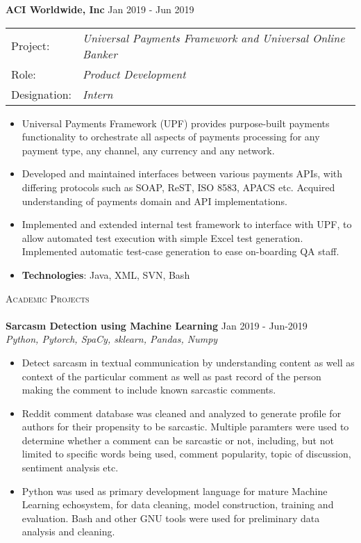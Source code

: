 \documentclass[a4paper]{article}
\newcommand{\lineunder} {
    \vspace*{-8pt} \\
    \hspace*{-18pt} \hrulefill \\
}
\newcommand{\header} [1] {
    {\hspace*{-18pt}\vspace*{6pt} \textsc{#1}}
    \vspace*{-6pt} \lineunder
}
\begin{document}
\textbf{ACI Worldwide, Inc}  \hfill Jan 2019 - Jun 2019\\
\begin{tabular}{ l l }
Project: & \textit{Universal Payments Framework and Universal Online Banker } \\
Role: & \textit{Product Development} \\
Designation: & \textit{Intern} \\
\end{tabular}
\vspace{-1mm}
\begin{itemize} \itemsep 1pt
	\item Universal Payments Framework (UPF) provides purpose-built payments functionality to orchestrate all aspects of payments processing for any payment type, any channel, any currency and any network.
	\item Developed and maintained interfaces between various payments APIs, with differing protocols such as SOAP, ReST, ISO 8583, APACS etc. Acquired understanding of payments domain and API implementations.
	\item Implemented and extended internal test framework to interface with UPF, to allow automated test execution with simple Excel test generation. Implemented automatic test-case generation to ease on-boarding QA staff.
	\item \textbf{Technologies}: Java, XML, SVN, Bash
\end{itemize}

\header{Academic Projects}
\vspace{1mm}
{\textbf{Sarcasm Detection using Machine Learning}} \hfill Jan 2019 - Jun-2019\\
\textit{Python, Pytorch, SpaCy, sklearn, Pandas, Numpy} \\
\begin{itemize}
   \item Detect sarcasm in textual communication by understanding content as well as context of the particular comment as well as past record of the person making the comment to include known sarcastic comments.\\
  \item Reddit comment database was cleaned and analyzed to generate profile for authors for their propensity to be sarcastic. Multiple paramters were used to determine whether a comment can be sarcastic or not, including, but not limited to specific words being used, comment popularity, topic of discussion, sentiment analysis etc.
  \item Python was used as primary development language for mature Machine Learning echosystem, for data cleaning, model construction, training and evaluation. Bash and other GNU tools were used for preliminary data analysis and cleaning.
\end{itemize}
\vspace*{2mm}
\end{document}
